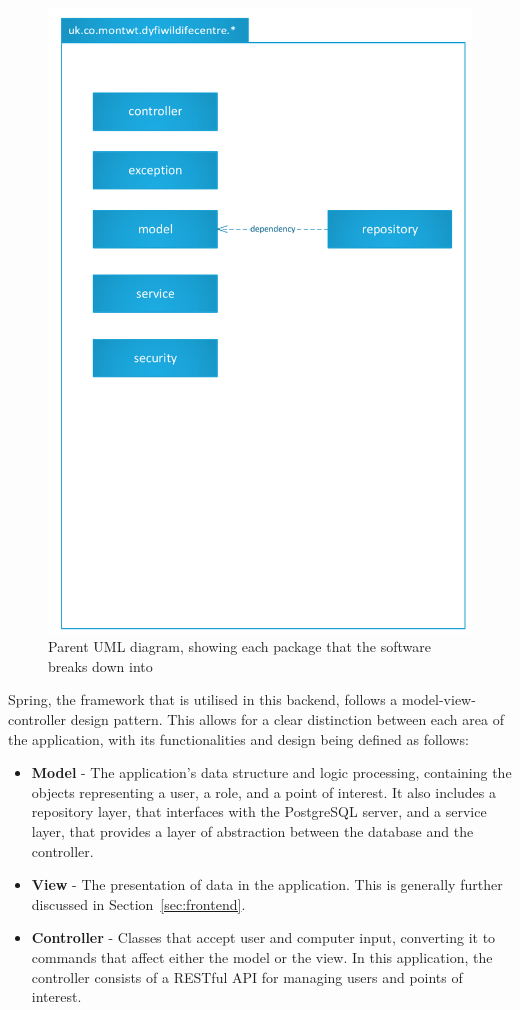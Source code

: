 \begin{figure}[!ht]
	\includegraphics[scale=0.5]{diagrams/parent_uml}
	\caption{Parent UML diagram, showing each package that the software breaks down into}
\end{figure}	

Spring, the framework that is utilised in this backend, follows a model-view-controller design pattern. This allows for a clear distinction between each area of the application, with its functionalities and design being defined as follows:

\begin{itemize}
	\item	\textbf{Model} - The application's data structure and logic processing, containing the objects representing a user, a role, and a point of interest. It also includes a repository layer, that interfaces with the PostgreSQL server, and a service layer, that provides a layer of abstraction between the database and the controller.
	\item	\textbf{View} - The presentation of data in the application. This is generally further discussed in Section~\ref{sec:frontend}.
	\item	\textbf{Controller} - Classes that accept user and computer input, converting it to commands that affect either the model or the view. In this application, the controller consists of a RESTful API for managing users and points of interest.
\end{itemize}

